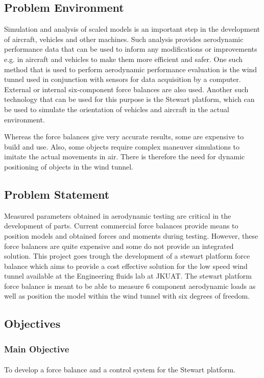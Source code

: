 \subsection{Problem Environment}
Simulation and analysis of scaled models is an important step in the development of aircraft, vehicles and other machines. Such analysis provides aerodynamic performance data that can be used to inform any modifications or improvements e.g. in aircraft and vehicles to make them more efficient and safer. One such method that is used to perform aerodynamic performance evaluation is the wind tunnel used in conjunction with sensors for data acquisition by a computer. External or internal six-component force balances are also used. Another such technology that can be used for this purpose is the Stewart platform, which can be used to simulate the 
orientation of vehicles and aircraft in the actual environment.

Whereas the force balances give very accurate results, some are expensive to build and use. Also, some objects require complex maneuver simulations to imitate the actual movements in air. There is therefore the need for dynamic positioning of objects in the wind tunnel.
\subsection{Problem Statement}
Measured parameters obtained in aerodynamic testing are critical in the development of parts. Current commercial force balances provide means to position models and obtained forces and moments during testing. 
However, these force balances are quite expensive and some do not provide an integrated solution. This project goes trough the development of a stewart platform force balance which aims to provide a cost effective solution for the low speed wind tunnel available at the Engineering fluids lab at JKUAT. 
The stewart platform force balance is meant to be able to measure 6 component aerodynamic loads as well as position the model within the wind tunnel with six degrees of freedom.
\subsection{Objectives}
\subsubsection{Main Objective}
\paragraph{} To develop a force balance and a control system for the Stewart platform. 
